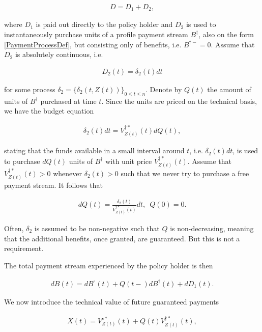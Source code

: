 \documentclass{book}
\newcommand{\1}[1]{\mathbbm{1}_{\left\lbrace #1 \right\rbrace}}
\theoremstyle{break}
\theoremstyle{remark}
\numberwithin{equation}{section}
\begin{document}
\begin{align*}
D = D_1 + D_2,
\end{align*}

where $D_1$ is paid out directly to the policy holder and $D_2$ is used to instantaneously purchase units of a profile payment stream $B^\dagger$, also on the form \ref{PaymentProcessDef}, but consisting only of benefits, i.e. $B^{\dagger -}=0$. Assume that $D_2$ is absolutely continuous, i.e.

\begin{align*}
D_2(t) = \delta_2(t) dt
\end{align*}

for some process $\delta_2 = \{ \delta_2(t,Z(t)) \}_{0 \leq t \leq n}$. Denote by $Q(t)$ the amount of units of $B^\dagger$ purchased at time $t$. Since the units are priced on the technical basis, we have the budget equation

\begin{align*}
\delta_2(t) dt = V_{Z(t)}^{\dagger*}(t) dQ(t),
\end{align*}

stating that the funds available in a small interval around $t$, i.e. $\delta_2(t) dt$, is used to purchase $dQ(t)$ units of $B^\dagger$ with unit price $V_{Z(t)}^{\dagger*}(t)$. Assume that $V_{Z(t)}^{\dagger*}(t)>0$ whenever $\delta_2(t)>0$ such that we never try to purchase a free payment stream. It follows that

\begin{align} \label{QDynamics}
dQ(t) = \frac{\delta_2(t)}{V_{Z(t)}^{\dagger*}(t)}  dt, \, \, \, Q(0)=0.
\end{align}

Often, $\delta_2$ is assumed to be non-negative such that $Q$ is non-decreasing, meaning that the additional benefits, once granted, are guaranteed. But this is not a requirement.

The total payment stream experienced by the policy holder is then

\begin{align} \label{WithProfitTotalBenefits}
dB(t) = dB^\circ(t) + Q(t-) dB^\dagger(t) + dD_1(t).
\end{align}

We now introduce the technical value of future guaranteed payments

\begin{align*}
X(t) = V_{Z(t)}^{\circ*}(t) + Q(t) V_{Z(t)}^{\dagger*}(t),
\end{align*}
\end{document}
